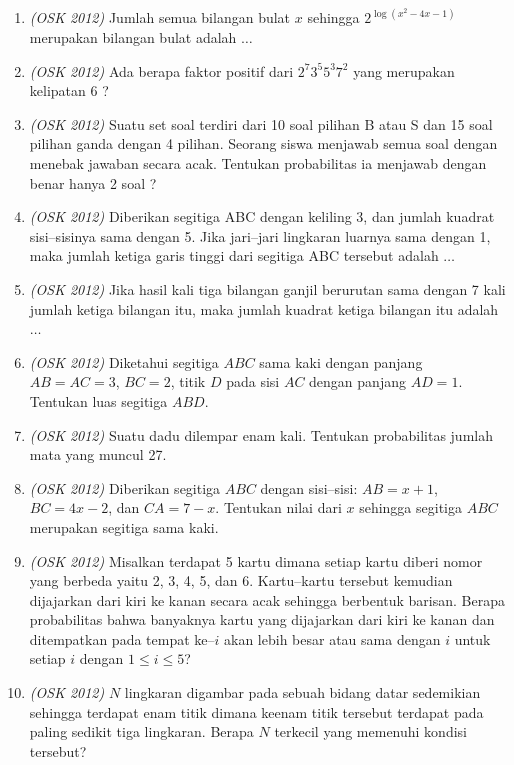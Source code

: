 \begin{enumerate}
	\item \textit{(OSK 2012)} Jumlah semua bilangan bulat $x$ sehingga $2^{\log(x^2 - 4x - 1)}$ merupakan bilangan bulat adalah $\dots$
	
	\item \textit{(OSK 2012)} Ada berapa faktor positif dari $2^7 3^5 5^3 7^2$ yang merupakan kelipatan 6 ?
	
	\item \textit{(OSK 2012)} Suatu set soal terdiri dari 10 soal pilihan B atau S dan 15 soal pilihan ganda dengan 4 pilihan. Seorang siswa menjawab semua soal dengan menebak jawaban secara acak. Tentukan probabilitas ia menjawab dengan benar hanya 2 soal ?
	
	\item \textit{(OSK 2012)} Diberikan segitiga ABC dengan keliling 3, dan jumlah kuadrat sisi–sisinya sama dengan 5. Jika jari–jari lingkaran luarnya sama dengan 1, maka jumlah ketiga garis tinggi dari segitiga ABC tersebut adalah $\dots$
	
	\item \textit{(OSK 2012)} Jika hasil kali tiga bilangan ganjil berurutan sama dengan 7 kali jumlah ketiga bilangan itu, maka jumlah kuadrat ketiga bilangan itu adalah $\dots$
	
	\item \textit{(OSK 2012)} Diketahui segitiga $ABC$ sama kaki dengan panjang $AB = AC = 3$, $BC = 2$, titik $D$ pada sisi $AC$ dengan panjang $AD = 1$. Tentukan luas segitiga $ABD$.
	
	\item \textit{(OSK 2012)} Suatu dadu dilempar enam kali. Tentukan probabilitas jumlah mata yang muncul 27.
	
	\item \textit{(OSK 2012)} Diberikan segitiga $ABC$ dengan sisi–sisi: $AB = x + 1$, $BC = 4x - 2$, dan $CA = 7 - x$. Tentukan nilai dari $x$ sehingga segitiga $ABC$ merupakan segitiga sama kaki.
	
	\item \textit{(OSK 2012)} Misalkan terdapat 5 kartu dimana setiap kartu diberi nomor yang berbeda yaitu 2, 3, 4, 5, dan 6. Kartu–kartu tersebut kemudian dijajarkan dari kiri ke kanan secara acak sehingga berbentuk barisan. Berapa probabilitas bahwa banyaknya kartu yang dijajarkan dari kiri ke kanan dan ditempatkan pada tempat ke–$i$ akan lebih besar atau sama dengan $i$ untuk setiap $i$ dengan $1 \le i \le 5$?
	
	\item \textit{(OSK 2012)} $N$ lingkaran digambar pada sebuah bidang datar sedemikian sehingga terdapat enam titik dimana keenam titik tersebut terdapat pada paling sedikit tiga lingkaran. Berapa $N$ terkecil yang memenuhi kondisi tersebut?
	
\end{enumerate}
\newpage

